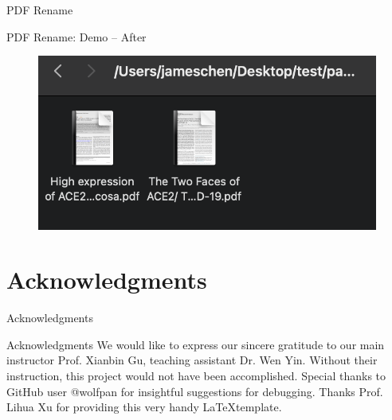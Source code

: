 \documentclass[a4paper,10pt]{beamer}
\begin{document}
\begin{frame}{PDF Rename}
\begin{block}{PDF Rename: Demo -- After}
\begin{figure}[H]
    \includegraphics[width=\textwidth]{file_rename_after.png}
\end{figure}
\end{block}
\end{frame}

\section{Acknowledgments}
\begin{frame}{Acknowledgments}
\begin{block}{Acknowledgments}
We would like to express our sincere gratitude to our main instructor Prof. Xianbin Gu, teaching assistant Dr. Wen Yin. Without their instruction, this project would not have been accomplished. Special thanks to GitHub user @wolfpan for insightful suggestions for debugging. Thanks Prof. Lihua Xu for providing this very handy \LaTeX template.
\end{block}
\end{frame}
\end{document}
